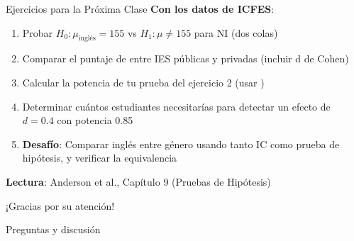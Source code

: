 \documentclass[aspectratio=169, 11pt]{beamer}
\begin{document}
\begin{frame}{Ejercicios para la Próxima Clase}
\textbf{Con los datos de ICFES}:
\begin{enumerate}
  \item Probar $H_0: \mu_{\text{inglés}} = 155$ vs $H_1: \mu \neq 155$ para NI (dos colas)
  \item Comparar el puntaje de  entre IES públicas y privadas (incluir d de Cohen)
  \item Calcular la potencia de tu prueba del ejercicio 2 (usar )
  \item Determinar cuántos estudiantes necesitarías para detectar un efecto de $d = 0.4$ con potencia 0.85
  \item \textbf{Desafío}: Comparar inglés entre género usando tanto IC como prueba de hipótesis, y verificar la equivalencia
\end{enumerate}

\vspace{0.3cm}
\textbf{Lectura}: Anderson et al., Capítulo 9 (Pruebas de Hipótesis)
\end{frame}

\begin{frame}
\begin{center}
\Large
¡Gracias por su atención!

\vspace{1cm}
\normalsize
Preguntas y discusión
\end{center}
\end{frame}
\end{document}

